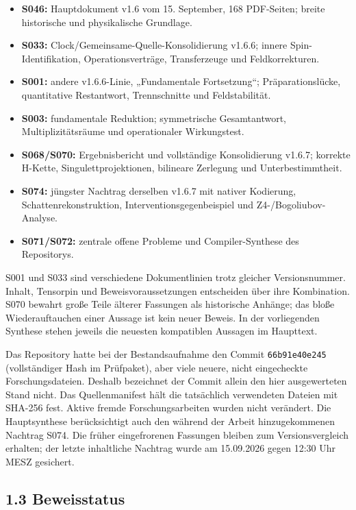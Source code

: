 \begin{itemize}
\tightlist
\item
  \textbf{S046:} Hauptdokument v1.6 vom 15. September, 168 PDF-Seiten;
  breite historische und physikalische Grundlage.
\item
  \textbf{S033:} Clock/Gemeinsame-Quelle-Konsolidierung v1.6.6; innere
  Spin-Identifikation, Operationsverträge, Transferzeuge und
  Feldkorrekturen.
\item
  \textbf{S001:} andere v1.6.6-Linie, „Fundamentale Fortsetzung``;
  Präparationslücke, quantitative Restantwort, Trennschnitte und
  Feldstabilität.
\item
  \textbf{S003:} fundamentale Reduktion; symmetrische Gesamtantwort,
  Multiplizitätsräume und operationaler Wirkungstest.
\item
  \textbf{S068/S070:} Ergebnisbericht und vollständige Konsolidierung
  v1.6.7; korrekte H-Kette, Singulettprojektionen, bilineare Zerlegung
  und Unterbestimmtheit.
\item
  \textbf{S074:} jüngster Nachtrag derselben v1.6.7 mit nativer
  Kodierung, Schattenrekonstruktion, Interventionsgegenbeispiel und
  Z4-/Bogoliubov-Analyse.
\item
  \textbf{S071/S072:} zentrale offene Probleme und Compiler-Synthese des
  Repositorys.
\end{itemize}

S001 und S033 sind verschiedene Dokumentlinien trotz gleicher
Versionsnummer. Inhalt, Tensorpin und Beweisvoraussetzungen entscheiden
über ihre Kombination. S070 bewahrt große Teile älterer Fassungen als
historische Anhänge; das bloße Wiederauftauchen einer Aussage ist kein
neuer Beweis. In der vorliegenden Synthese stehen jeweils die neuesten
kompatiblen Aussagen im Haupttext.

Das Repository hatte bei der Bestandsaufnahme den Commit
\texttt{66b91e40e245} (vollständiger Hash im Prüfpaket), aber viele
neuere, nicht eingecheckte Forschungsdateien. Deshalb bezeichnet der
Commit allein den hier ausgewerteten Stand nicht. Das Quellenmanifest
hält die tatsächlich verwendeten Dateien mit SHA-256 fest. Aktive fremde
Forschungsarbeiten wurden nicht verändert. Die Hauptsynthese
berücksichtigt auch den während der Arbeit hinzugekommenen Nachtrag
S074. Die früher eingefrorenen Fassungen bleiben zum Versionsvergleich
erhalten; der letzte inhaltliche Nachtrag wurde am 15.09.2026 gegen
12:30 Uhr MESZ gesichert.

\subsection{1.3 Beweisstatus}\label{beweisstatus}

